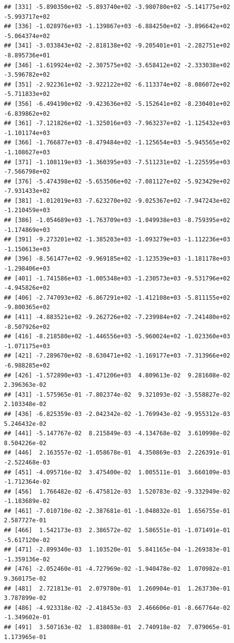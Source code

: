\documentclass[
]{article}
\begin{document}
\begin{verbatim}
## [331] -5.890350e+02 -5.893740e+02 -3.980780e+02 -5.141775e+02 -5.993717e+02
## [336] -1.028976e+03 -1.139867e+03 -6.884250e+02 -3.896642e+02 -5.064374e+02
## [341] -3.033843e+02 -2.818138e+02 -9.205401e+01 -2.282751e+02 -8.895736e+01
## [346] -1.619924e+02 -2.307575e+02 -3.658412e+02 -2.333038e+02 -3.596782e+02
## [351] -2.922361e+02 -3.922122e+02 -6.113374e+02 -8.086072e+02 -5.711833e+02
## [356] -6.494190e+02 -9.423636e+02 -5.152641e+02 -8.230401e+02 -6.839862e+02
## [361] -7.121826e+02 -1.325016e+03 -7.963237e+02 -1.125432e+03 -1.101174e+03
## [366] -1.766877e+03 -8.479484e+02 -1.125654e+03 -5.945565e+02 -1.108627e+03
## [371] -1.108119e+03 -1.360395e+03 -7.511231e+02 -1.225595e+03 -7.566798e+02
## [376] -5.474398e+02 -5.653506e+02 -7.081127e+02 -5.923429e+02 -7.931433e+02
## [381] -1.012019e+03 -7.623270e+02 -9.025367e+02 -7.947243e+02 -1.210459e+03
## [386] -1.054689e+03 -1.763709e+03 -1.049938e+03 -8.759395e+02 -1.174869e+03
## [391] -9.273201e+02 -1.385203e+03 -1.093279e+03 -1.112236e+03 -1.150613e+03
## [396] -8.561477e+02 -9.969185e+02 -1.123539e+03 -1.181178e+03 -1.298406e+03
## [401] -1.741586e+03 -1.005348e+03 -1.230573e+03 -9.531796e+02 -4.945826e+02
## [406] -2.747093e+02 -6.867291e+02 -1.412108e+03 -5.811155e+02 -9.800365e+02
## [411] -4.883521e+02 -9.262726e+02 -7.239984e+02 -7.241480e+02 -8.507926e+02
## [416] -8.218580e+02 -1.446556e+03 -5.960024e+02 -1.023360e+03 -1.071175e+03
## [421] -7.289670e+02 -8.630471e+02 -1.169177e+03 -7.313966e+02 -6.988285e+02
## [426] -1.572890e+03 -1.471206e+03  4.809613e-02  9.281608e-02  2.396363e-02
## [431] -1.575965e-01 -7.802374e-02  9.321093e-02 -3.558827e-02  2.103348e-02
## [436] -6.825359e-03 -2.042342e-02 -1.769943e-02 -9.955312e-03  5.246432e-02
## [441] -5.147767e-02  8.215849e-03 -4.134768e-02  3.610998e-02  8.504226e-02
## [446]  2.163557e-02 -1.058678e-01  4.350869e-03  2.226391e-01 -2.522468e-03
## [451] -4.095716e-02  3.475400e-02  1.005511e-01  3.660109e-03 -1.712364e-02
## [456]  1.766482e-02 -6.475812e-03  1.520783e-02 -9.332949e-02 -1.183689e-02
## [461] -7.010710e-02 -2.387681e-01 -1.048032e-01  1.656755e-01  2.587727e-01
## [466]  1.542173e-03  2.386572e-02  1.586551e-01 -1.071491e-01 -5.617120e-02
## [471] -2.899340e-03  1.103520e-01  5.841165e-04 -1.269383e-01 -1.359136e-02
## [476] -2.052460e-01 -4.727969e-02 -1.940478e-02  1.070982e-01  9.360175e-02
## [481]  2.721813e-01  2.079780e-01  1.260904e-01  1.263730e-01  3.787899e-02
## [486] -4.923318e-02 -2.418453e-03  2.466606e-01 -8.667764e-02 -1.349602e-01
## [491]  3.507163e-02  1.838088e-01  2.740918e-02  7.079065e-01  1.173965e-01

\end{verbatim}
\end{document}
